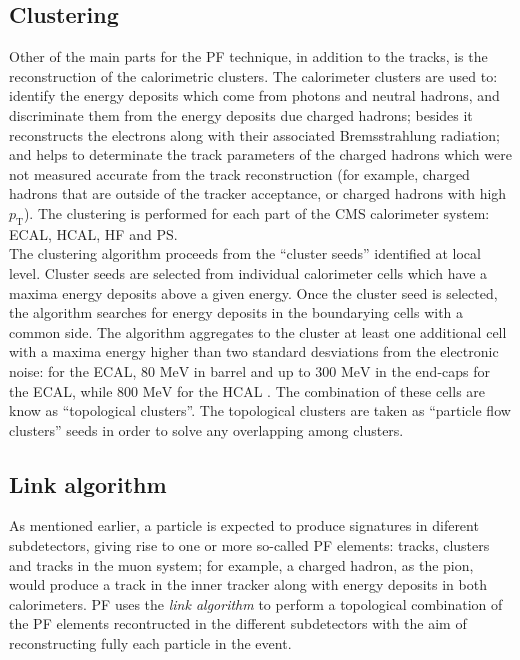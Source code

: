 \subsection{Clustering}
\label{subsec:Clustering}
Other of the main parts for the PF technique, in addition to the tracks, is the reconstruction of the 
calorimetric clusters. The calorimeter clusters are used to: identify the energy deposits which come from 
photons and neutral hadrons, and discriminate them from the energy deposits due charged hadrons; 
besides it reconstructs the electrons along with their associated Bremsstrahlung radiation;
and helps to determinate the track parameters of the charged hadrons which were not measured 
accurate from the track reconstruction (for example, charged hadrons that are outside of the tracker acceptance, or 
charged hadrons with high $p_{\textrm{T}}$). The clustering is performed for 
each part of the CMS calorimeter system: ECAL, HCAL, HF and PS.\\

The clustering algorithm proceeds from the ``cluster seeds'' identified at local level. Cluster seeds are selected 
from individual calorimeter cells which have a maxima energy deposits above a given energy. Once the cluster seed is selected,
the algorithm searches for energy deposits in the  boundarying cells with a common side. The algorithm aggregates to the cluster 
at least one additional cell with a maxima energy higher than two standard desviations from the electronic noise: for the ECAL, 80 $\textrm{MeV}$ in 
barrel and up to 300 $\textrm{MeV}$ in the end-caps for the ECAL, while 800 $\textrm{MeV}$ for the HCAL \cite{CMS-PAS-PFT-09-001}. The 
combination of these cells are know as ``topological clusters''. The topological clusters are taken as ``particle flow clusters'' seeds
in order to solve any overlapping among clusters.

\subsection{Link algorithm}
\label{subsec:Linkalgorithm}
As mentioned earlier, a particle is expected to produce signatures in diferent subdetectors, giving rise to one or more 
so-called PF elements: tracks, clusters and tracks in the muon system; for example, 
a charged hadron, as the pion, would produce a track in the inner tracker along with 
energy deposits in both calorimeters. PF uses the \textit{link algorithm} to perform a topological combination 
of the PF elements recontructed in the different subdetectors with the aim of reconstructing fully each particle in the event. 


